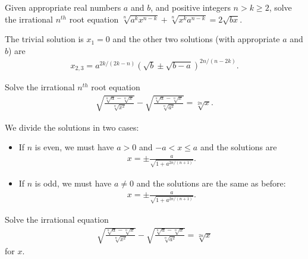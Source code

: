 \begin{question}\label{p:irrational-K}
    Given appropriate real numbers $a$ and $b$, and positive integers $n>k\geq 2$, solve the irrational $n^{th}$ root equation $\sqrt[n]{a^kx^{n-k}}+\sqrt[n]{x^ka^{n-k}}=2\sqrt{bx}$.
\end{question}

\begin{solution}
    The trivial solution is $x_1=0$ and the other two solutions (with appropriate $a$ and $b$) are
    \begin{align*}
        x_{2,3} = a^{2k/(2k-n)} \left(\sqrt{b}\pm \sqrt{b-a}\right)^{2n/(n-2k)}.
    \end{align*}
\end{solution}


\begin{question}\label{p:irrational-L}
    Solve the irrational $n^{th}$ root equation
    \begin{align*}
        \sqrt{\frac{\sqrt[n]{a}-\sqrt[n]{x}}{\sqrt[n]{x^2}}}-\sqrt{\frac{\sqrt[n]{a}-\sqrt[n]{x}}{\sqrt[n]{a^2}}}=\sqrt[2n]{x}.
    \end{align*}
\end{question}

\begin{solution}
    We divide the solutions in two cases:
    \begin{itemize}
        \item If $n$ is even, we must have $a>0$ and $-a< x \leq a$ and the solutions are
        \begin{align*}
            x=\pm\frac{a}{\sqrt{1+a^{2n/(n+1)}}}.
        \end{align*}
        \item If $n$ is odd, we must have $a \neq 0$ and the solutions are the same as before:
        \begin{align*}
            x=\pm\frac{a}{\sqrt{1+a^{2n/(n+1)}}}.
        \end{align*}
    \end{itemize}
\end{solution}

\begin{question}\label{p:irrational-M}
    Solve the irrational equation 
    \begin{align*}
        \displaystyle \sqrt{\frac{\sqrt[n]{a}-\sqrt[n]{x}}{\sqrt[n]{x^2}}}-\sqrt{\frac{\sqrt[n]{a}-\sqrt[n]{x}}{\sqrt[n]{a^2}}}=\sqrt[2n]{x}
    \end{align*}
    for $x$.
\end{question}

